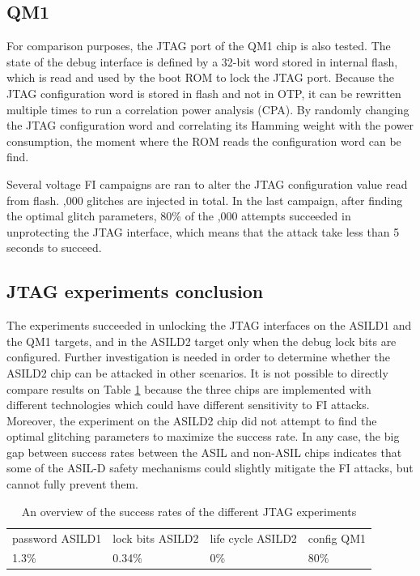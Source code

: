 \documentclass[10pt, conference, compsocconf]{IEEEtran}
\newcommand{\TI}{ASILD1\xspace}
\newcommand{\ST}{ASILD2\xspace}
\newcommand{\NXP}{QM1\xspace}
\begin{document}
\subsection{\NXP}
For comparison purposes, the JTAG port of the \NXP chip is also tested. The state of the debug interface is defined by a 32-bit word stored in internal flash, which is read and used by the boot ROM to lock the JTAG port. Because the JTAG configuration word is stored in flash and not in OTP, it can be rewritten multiple times to run a correlation power analysis (CPA). By randomly changing the JTAG configuration word and correlating its Hamming weight with the power consumption, the moment where the ROM reads the configuration word can be find. 

Several voltage FI campaigns are ran to alter the JTAG configuration value read from flash. ,000 glitches are injected in total. In the last campaign, after finding the optimal glitch parameters, 80\% of the ,000 attempts succeeded in unprotecting the JTAG interface, which means that the attack take less than 5 seconds to succeed.


\subsection{JTAG experiments conclusion}
The experiments succeeded in unlocking the JTAG interfaces on the \TI and the \NXP targets, and in the \ST target only when the debug lock bits are configured. Further investigation is needed in order to determine whether the \ST chip can be attacked in other scenarios.
It is not possible to directly compare results on Table \ref{tab:jtag-experiments} because the three chips are implemented with different technologies which could have different sensitivity to FI attacks. Moreover, the experiment on the \ST chip did not attempt to find the optimal glitching parameters to maximize the success rate. In any case, the big gap between success rates between the ASIL and non-ASIL chips indicates that some of the ASIL-D safety mechanisms could slightly mitigate the FI attacks, but cannot fully prevent them.

\begin{table}[!t]
\caption{An overview of the success rates of the different JTAG experiments} 
\label{tab:jtag-experiments}
\centering
\begin{tabular}{p{} p{} p{} p{}}
\toprule
          
        password \TI
        & lock bits \ST
        & life cycle \ST
        & config \NXP
        \\
    \cmidrule(lr){1-4}          
        1.3\%
        & 0.34\%
        & 0\%
        & 80\%
        \\
\bottomrule
\end{tabular}
\end{table}
\end{document}
